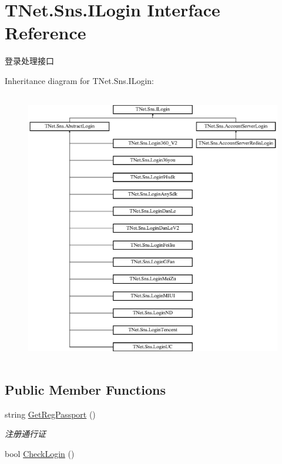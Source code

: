 \hypertarget{interface_t_net_1_1_sns_1_1_i_login}{}\section{T\+Net.\+Sns.\+I\+Login Interface Reference}
\label{interface_t_net_1_1_sns_1_1_i_login}


登录处理接口  


Inheritance diagram for T\+Net.\+Sns.\+I\+Login\+:\begin{figure}[H]
\begin{center}
\leavevmode
\includegraphics[height=12.000000cm]{interface_t_net_1_1_sns_1_1_i_login}
\end{center}
\end{figure}
\subsection*{Public Member Functions}
\begin{DoxyCompactItemize}
\item 
string \mbox{\hyperlink{interface_t_net_1_1_sns_1_1_i_login_a74bd2db9f18c212d23fa01462bb0a845}{Get\+Reg\+Passport}} ()
\begin{DoxyCompactList}\small\item\em 注册通行证 \end{DoxyCompactList}\item 
bool \mbox{\hyperlink{interface_t_net_1_1_sns_1_1_i_login_a55b0a846946c8ea19a120d8fdb2d7b86}{Check\+Login}} ()
\end{DoxyCompactItemize}

